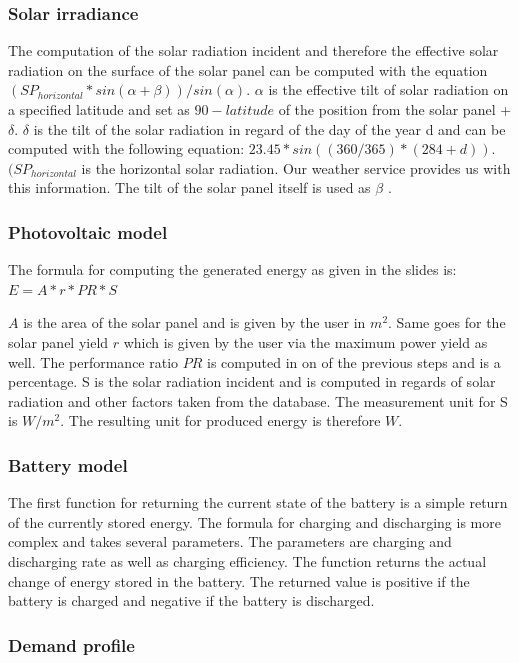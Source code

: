 \subsubsection{Solar irradiance}
The computation of the solar radiation incident and therefore the effective solar radiation on the surface of the solar panel can be computed with the equation $(SP_{horizontal} * sin(\alpha + \beta))/sin(\alpha)$.
$\alpha$ is the effective tilt of solar radiation on a specified latitude and set as $90 - latitude$ of the position from the solar panel + $\delta$.
$\delta$ is the tilt of the solar radiation in regard of the day of the year d and can be computed with the following equation: $23.45 * sin((360/365) * (284 + d))$. $(SP_{horizontal}$ is the horizontal solar radiation. Our weather service provides us with this information.
The tilt of the solar panel  itself is used as $\beta$ \cite{SolarRadiation}.

\subsubsection{Photovoltaic model}
The formula for computing the generated energy as given in the slides is: $E = A * r * PR * S$

$A$ is the area of the solar panel and is given by the user in $m^{2}$.
Same goes for the solar panel yield $r$ which is given by the user via the maximum power yield as well.
The performance ratio $PR$  is computed in on of the previous steps and is  a percentage.
S is the solar radiation incident and is computed in regards of solar radiation and other factors taken from the database.
The measurement unit for S is $W/m^{2}$.
The resulting unit for produced energy is therefore $W$.
\subsubsection{Battery model}
The first function for returning the current state of the battery is a simple return of the currently stored energy.
The formula for charging and discharging is more complex and takes several parameters.
The parameters are charging and discharging rate as well as charging efficiency.
The function returns the actual change of energy stored in the battery.
The returned value is positive if the battery is charged and negative if the battery is discharged.
\subsubsection{Demand profile}\label{subsec:Demand}

